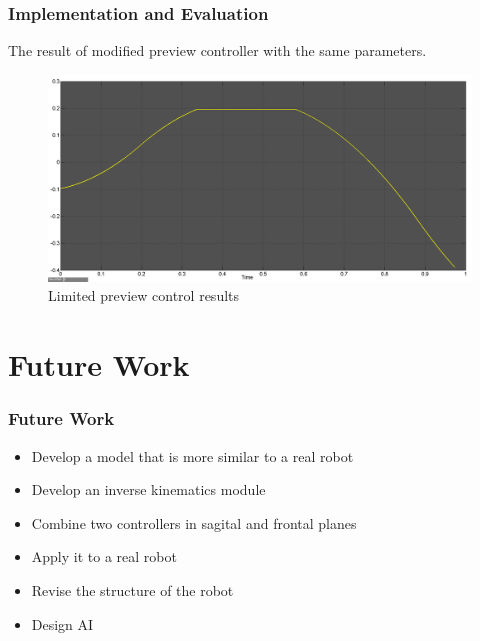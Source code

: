\documentclass{beamer}
\begin{document}

	\begin{frame}
		\frametitle{Implementation and Evaluation}
		The result of modified preview controller with the same parameters.
		
		\begin{figure}[h!]
			\centering
			\includegraphics[width=0.8\linewidth]{presentation_images/30}
			\caption{Limited preview control results}
		\end{figure}
	\end{frame}
	

	\section*{Future Work}
	\begin{frame}
		\frametitle{Future Work}
		\begin{itemize}
			\item
				Develop a model that is more similar to a real robot
			\item
				Develop an inverse kinematics module	
			\item
				Combine two controllers in sagital and frontal planes
			\item
				Apply it to a real robot
			\item
				Revise the structure of the robot
			\item
				Design AI
		\end{itemize}
	\end{frame}
	
\end{document}
